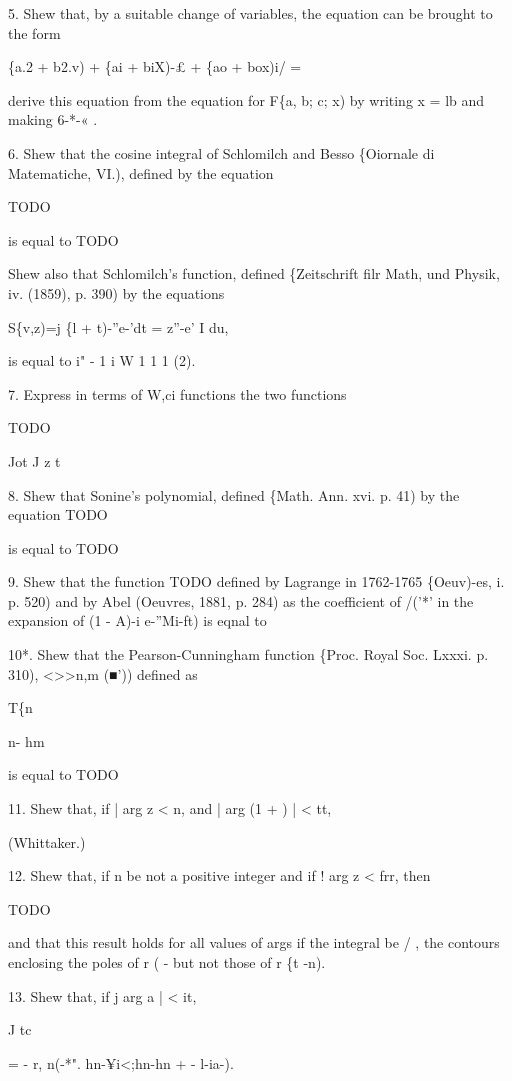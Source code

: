 5. Shew that, by a suitable change of variables, the equation can be
brought to the form

\{a.2 + b2.v) + \{ai + biX)-£ + \{ao + box)i/ =

derive this equation from the equation for F\{a, b; c; x) by writing x
= lb and making 6-*-« .

6. Shew that the cosine integral of Schlomilch and Besso \{Oiornale di
Matematiche, VI.), defined by the equation

TODO

is equal to TODO

Shew also that Schlomilch's function, defined \{Zeitschrift filr Math,
und Physik, iv. (1859), p. 390) by the equations

S\{v,z)=j \{l + t)-''e-'dt = z''-e' I du,

is equal to i" - 1 i W  1  1  1  (2).

7. Express in terms of W,ci functions the two functions

TODO

Jot J z t

8. Shew that Sonine's polynomial, defined \{Math. Ann. xvi. p. 41) by
the equation TODO

is equal to TODO

%
%

9. Shew that the function TODO defined by Lagrange in 1762-1765
\{Oeuv)-es, i. p. 520) and by Abel (Oeuvres, 1881, p. 284) as the
coefficient of /('*' in the expansion of (1 - A)-i e-''Mi-ft) is eqnal
to

10*. Shew that the Pearson-Cunningham function \{Proc. Royal Soc.
Lxxxi. p. 310), <>>n,m (■')) defined as

T\{n

n- hm

is equal to  TODO

11. Shew that, if | arg z < n, and | arg (1 + ) | < tt,

(Whittaker.)

12. Shew that, if n be not a positive integer and if ! arg z < frr,
then

TODO

and that this result holds for all values of args if the integral be /
, the contours enclosing the poles of r ( - but not those of r \{t
-n).

13. Shew that, if j arg a | < it,

J tc

= - r, n(-*". hn-¥i<;hn-hn + - l-ia-).

